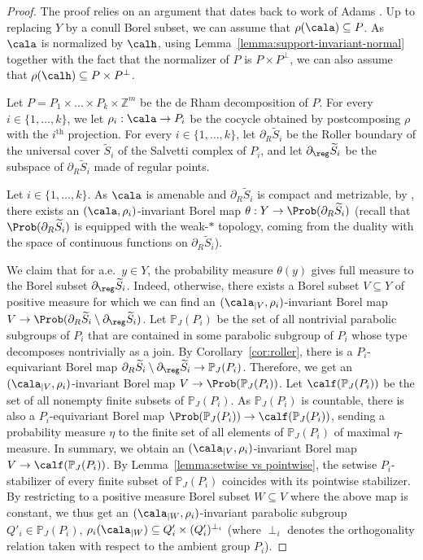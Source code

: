 \begin{proof}
The proof relies on an argument that dates back to work of Adams \cite{Ada}. Up to replacing $Y$ by a conull Borel subset, we can assume that $\rho(\cala)\subseteq P$. As $\cala$ is normalized by $\calh$, using Lemma~\ref{lemma:support-invariant-normal} together with the fact that the normalizer of $P$ is $P\times P^{\perp}$, we can also assume that $\rho(\calh)\subseteq P\times P^\perp$.

Let $P=P_1\times\dots\times P_k\times\mathbb{Z}^m$ be the de Rham decomposition of $P$. For every $i\in\{1,\dots,k\}$, we let $\rho_i:\cala\to P_i$ be the cocycle obtained by postcomposing $\rho$ with the $i^{\text{th}}$ projection. For every $i\in\{1,\dots,k\}$, let $\partial_R \widetilde{S}_i$ be the Roller boundary of the universal cover $\widetilde{S}_i$ of the Salvetti complex of $P_i$, and let $\partial_\reg \widetilde{S}_i$ be the subspace of $\partial_R \widetilde{S}_i$ made of regular points.

Let $i\in\{1,\dots,k\}$. As $\cala$ is amenable and $\partial_R \widetilde{S}_i$ is compact and metrizable, by \cite[Prop.\,4.14]{Kid-survey}, there exists an $(\cala,\rho_i)$-invariant Borel map $\theta:Y\to\Prob(\partial_R \widetilde{S}_i)$ (recall that $\Prob(\partial_R\widetilde{S}_i)$ is equipped with the weak-$*$ topology, coming from the duality with the space of continuous functions on $\partial_R\widetilde{S}_i$).

We claim that for a.e.\ $y\in Y$, the probability measure $\theta(y)$ gives full measure to the Borel subset $\partial_\reg \widetilde{S}_i$. Indeed, otherwise, there exists a Borel subset $V\subseteq Y$ of positive measure for which we can find an $(\cala_{|V},\rho_i)$-invariant Borel map $V\to\Prob(\partial_R\widetilde{S}_i\setminus\nobreak\partial_\reg\widetilde{S}_i)$. Let $\mathbb{P}_J(P_i)$ be the set of all nontrivial parabolic subgroups of $P_i$ that are contained in some parabolic subgroup of $P_i$ whose type decomposes nontrivially as a join.
By Corollary~\ref{cor:roller}, there is a $P_i$-equivariant Borel map $\partial_R\widetilde{S}_i\setminus\partial_\reg\widetilde{S}_i\to \mathbb{P}_J(P_i)$. Therefore, we get an $(\cala_{|V},\rho_i)$-invariant Borel map $V\to\Prob(\mathbb{P}_J(P_i))$. Let $\calf(\mathbb{P}_J(P_i))$ be the set of all nonempty finite subsets of $\mathbb{P}_J(P_i)$. As $\mathbb{P}_J(P_i)$ is countable, there is also a $P_i$-equivariant Borel map $\Prob(\mathbb{P}_J(P_i))\to\calf(\mathbb{P}_J(P_i))$, sending a probability measure $\eta$ to the finite set of all elements of $\mathbb{P}_J(P_i)$ of maximal $\eta$-measure. In summary, we obtain an $(\cala_{|V},\rho_i)$-invariant Borel map $V\to\calf(\mathbb{P}_J(P_i))$. By Lemma~\ref{lemma:setwise vs pointwise}, the setwise $P_i$-stabilizer of every finite subset of $\mathbb{P}_J(P_i)$ coincides with its pointwise stabilizer. By restricting to a positive measure Borel subset $W\subseteq V$ where the above map is constant, we thus get an $(\cala_{|W},\rho_i)$-invariant parabolic subgroup $Q'_i\in\mathbb{P}_J(P_i)$, \ie $\rho_i(\cala_{|W})\subseteq Q'_i\times (Q'_i)^{\perp_i}$ (where $\perp_i$ denotes the orthogonality relation taken with respect to the ambient group $P_i$).\enlargethispage{\baselineskip}%


\end{proof}
